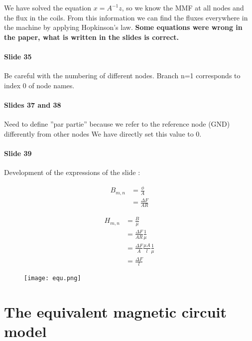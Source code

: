 We have solved the equation $x=A^{-1} z$, so we know the MMF at all nodes and the flux in the coils.
From this information we can find the fluxes everywhere in the machine by applying Hopkinson's law.
\textbf{Some equations were wrong in the paper, what is written in the slides is correct.}

\paragraph{Slide 35}
Be careful with the numbering of different nodes. Branch n=1 corresponds to index 0 of node names.

\paragraph{Slides 37 and 38}
Need to define ''par partie'' because we refer to the reference node (GND) differently from other nodes We have directly set this value to 0.

\paragraph{Slide 39}

Development of the expressions of the slide :

\begin{minipage}[t]{0.45\linewidth}
\begin{align*}
    B_{m,n} & = \frac{\phi}{A}\\
    & = \frac{\Delta F}{A R}
\end{align*}
\end{minipage}
\begin{minipage}[t]{0.45\linewidth}
\begin{align*}
    H_{m,n} & = \frac{B}{\mu}\\
    & = \frac{\Delta F}{A R} \frac{1}{\mu} \\
    & = \frac{\Delta F}{A} \frac{\mu A}{l} \frac{1}{\mu}\\
    & = \frac{\Delta F}{l}
\end{align*}
\end{minipage}

\begin{figure}[H]
    \centering
    \texttt{[image: equ.png]}
\end{figure}

\section{The equivalent magnetic circuit model}

